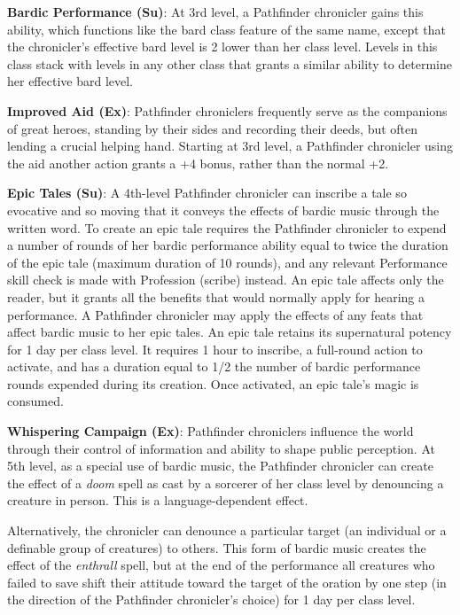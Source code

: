 \textbf{Bardic Performance (Su)}: At 3rd level, a Pathfinder chronicler gains this ability, which functions like the bard class feature of the same name, except that the chronicler's effective bard level is 2 lower than her class level. Levels in this class stack with levels in any other class that grants a similar ability to determine her effective bard level.
				
\textbf{Improved Aid (Ex)}: Pathfinder chroniclers frequently serve as the companions of great heroes, standing by their sides and recording their deeds, but often lending a crucial helping hand. Starting at 3rd level, a Pathfinder chronicler using the aid another action grants a +4 bonus, rather than the normal +2. 
				
\textbf{Epic Tales (Su)}: A 4th-level Pathfinder chronicler can inscribe a tale so evocative and so moving that it conveys the effects of bardic music through the written word. To create an epic tale requires the Pathfinder chronicler to expend a number of rounds of her bardic performance ability equal to twice the duration of the epic tale (maximum duration of 10 rounds), and any relevant Performance skill check is made with Profession (scribe) instead. An epic tale affects only the reader, but it grants all the benefits that would normally apply for hearing a performance. A Pathfinder chronicler may apply the effects of any feats that affect bardic music to her epic tales. An epic tale retains its supernatural potency for 1 day per class level. It requires 1 hour to inscribe, a full-round action to activate, and has a duration equal to 1/2 the number of bardic performance rounds expended during its creation. Once activated, an epic tale's magic is consumed.
				
\textbf{Whispering Campaign (Ex)}: Pathfinder chroniclers influence the world through their control of information and ability to shape public perception. At 5th level, as a special use of bardic music, the Pathfinder chronicler can create the effect of a \textit{doom} spell as cast by a sorcerer of her class level by denouncing a creature in person. This is a language-dependent effect.
				
Alternatively, the chronicler can denounce a particular target (an individual or a definable group of creatures) to others. This form of bardic music creates the effect of the \textit{enthrall} spell, but at the end of the performance all creatures who failed to save shift their attitude toward the target of the oration by one step (in the direction of the Pathfinder chronicler's choice) for 1 day per class level.
				
